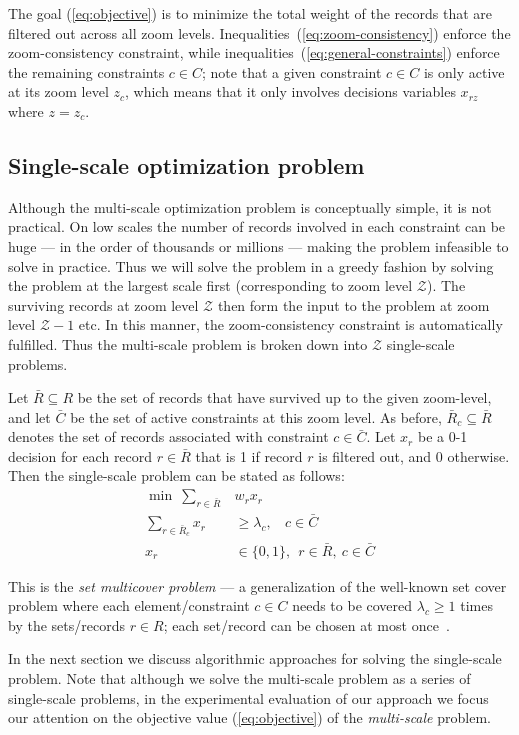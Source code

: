 The goal (\ref{eq:objective}) is to minimize the total weight of the records that are filtered out across all zoom levels. Inequalities~(\ref{eq:zoom-consistency}) enforce the zoom-consistency constraint, while inequalities~(\ref{eq:general-constraints}) enforce the remaining constraints $c \in C$; note that a given constraint $c \in C$ is only active at its zoom level $z_c$, which means that it only involves decisions variables $x_{rz}$ where $z = z_c$.

\subsection{Single-scale optimization problem}

Although the multi-scale optimization problem is conceptually simple, it is not practical. On low scales the number of records involved in each constraint can be huge --- in the order of thousands or millions --- making the problem infeasible to solve in practice. Thus we will solve the problem in a greedy fashion by solving the problem at the largest scale first (corresponding to zoom level $\mathcal{Z}$). The surviving records at zoom level $\mathcal{Z}$ then form the input to the problem at zoom level $\mathcal{Z}-1$ etc. In this manner, the zoom-consistency constraint is automatically fulfilled. Thus the multi-scale problem is broken down into $\mathcal{Z}$ single-scale problems.

Let $\bar{R} \subseteq R$ be the set of records that have survived up to the given zoom-level, and let $\bar{C}$ be the set of active constraints at this zoom level. As before, $\bar{R}_c \subseteq \bar{R}$ denotes the set of records associated with constraint $c \in \bar{C}$. Let $x_r$ be a 0-1 decision for each record $r \in \bar{R}$ that is 1 if record $r$ is filtered out, and 0 otherwise. Then the single-scale problem can be stated as follows:
\begin{align}
  \label{eq:objective-single}
  \min ~\sum_{r \in \bar{R}} &w_r x_r \\
  \label{eq:general-constraints-single}
  \sum_{r \in \bar{R}_c} x_r &\geq \lambda_c, ~~~~ c \in \bar{C} \\
  x_r & \in \{0, 1\}, ~~ r \in \bar{R}, ~c \in \bar{C}
\end{align}

This is the \emph{set multicover problem} --- a generalization of the well-known set cover problem where each element/constraint $c \in C$ needs to be covered $\lambda_c \geq 1$ times by the sets/records $r \in R$; each set/record can be chosen at most once~\cite{RajogopalanVazirani98}. 

In the next section we discuss algorithmic approaches for solving the single-scale problem. Note that although we solve the multi-scale problem as a series of single-scale problems, in the experimental evaluation of our approach we focus our attention on the objective value (\ref{eq:objective}) of the \emph{multi-scale} problem. 
